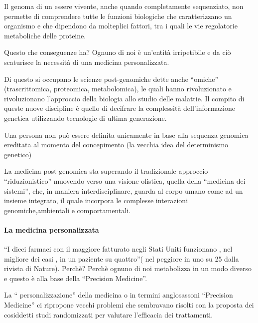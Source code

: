   Il genoma di un essere vivente, anche quando completamente
  sequenziato, non permette di comprendere tutte le funzioni biologiche
  che caratterizzano un organismo e che dipendono da molteplici fattori,
  tra i quali le vie regolatorie metaboliche delle proteine.

  Questo che conseguenze ha? Ognuno di noi è un'entità irripetibile e da
  ciò scaturisce la necessità di una medicina personalizzata.

  Di questo si occupano le scienze post-genomiche dette anche ``omiche''
  (trascrittomica, proteomica, metabolomica), le quali hanno
  rivoluzionato e rivoluzionano l'approccio della biologia allo studio
  delle malattie. Il compito di queste nuove discipline è quello di
  decifrare la complessità dell'informazione genetica utilizzando
  tecnologie di ultima generazione.

  Una persona non può essere definita unicamente in base alla sequenza
  genomica ereditata al momento del concepimento (la vecchia idea del
  determinismo genetico)

  La medicina post-genomica sta superando il tradizionale approccio
  ``riduzionistico'' muovendo verso una visione olistica, quella della
  ``medicina dei sistemi'', che, in maniera interdisciplinare, guarda al
  corpo umano come ad un insieme integrato, il quale incorpora le
  complesse interazioni genomiche,ambientali e comportamentali.

  \paragraph{La medicina personalizzata}

  ``I dieci farmaci con il maggiore fatturato negli Stati Uniti
  funzionano , nel migliore dei casi , in un paziente su quattro''( nel
  peggiore in uno su 25 dalla rivista di Nature). Perchè? Perchè ognuno
  di noi metabolizza in un modo diverso e questo è alla base della
  ``Precision Medicine''.

  La `` personalizzazione'' della medicina o in termini anglosassoni
  ``Precision Medicine'' ci ripropone vecchi problemi che sembravano
  risolti con la proposta dei cosiddetti studi randomizzati per valutare
  l'efficacia dei trattamenti.

